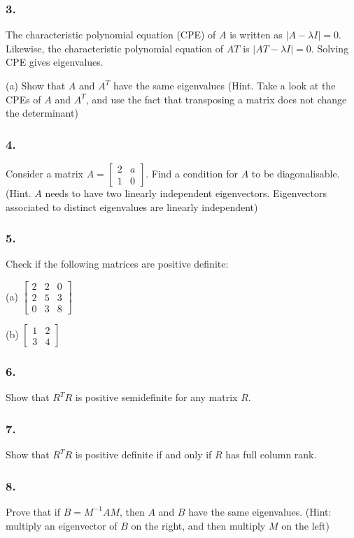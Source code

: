 \subsubsection{3.} The characteristic polynomial equation (CPE) of $A$ is written as $|A - \lambda I| = 0$. Likewise, the characteristic polynomial equation of $AT$ is $|AT - \lambda I| = 0$. Solving CPE gives eigenvalues.

(a) Show that $A$ and $A^T$ have the same eigenvalues (Hint. Take a look at the CPEs of $A$ and $A^T$, and use the fact that transposing a matrix does not change the determinant)

\subsubsection{4.} Consider a matrix $A = \begin{bmatrix}2&a\\1&0\end{bmatrix}$. Find a condition for $A$ to be diagonalisable.
(Hint. $A$ needs to have two linearly independent eigenvectors. Eigenvectors associated to distinct eigenvalues are linearly independent)

\subsubsection{5.} Check if the following matrices are positive definite:

(a) $\begin{bmatrix}
    2&2&0\\
    2&5&3\\
    0&3&8
\end{bmatrix}$

(b) $\begin{bmatrix}
    1&2\\3&4
\end{bmatrix}$

\subsubsection{6.} Show that $R^TR$ is positive semidefinite for any matrix $R$.

\subsubsection{7.} Show that $R^TR$ is positive definite if and only if $R$ has full column rank.

\subsubsection{8.} Prove that if $B = M^{-1}AM$, then $A$ and $B$ have the same eigenvalues. (Hint: multiply an eigenvector of $B$ on the right, and then multiply $M$ on the left)

